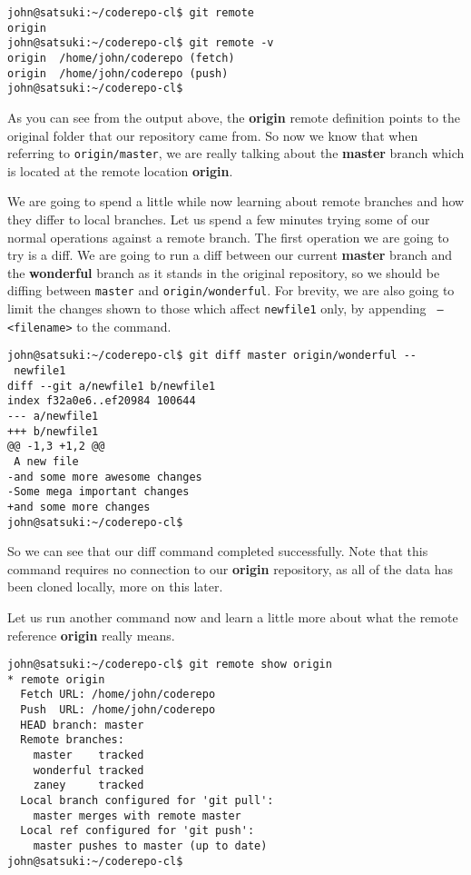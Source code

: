 \begin{Verbatim}
john@satsuki:~/coderepo-cl$ git remote
origin
john@satsuki:~/coderepo-cl$ git remote -v
origin	/home/john/coderepo (fetch)
origin	/home/john/coderepo (push)
john@satsuki:~/coderepo-cl$ 
\end{Verbatim}

As you can see from the output above, the \textbf{origin} remote definition points to the original folder that our repository came from.  So now we know that when referring to \texttt{origin/master}, we are really talking about the \textbf{master} branch which is located at the remote location \textbf{origin}.

We are going to spend a little while now learning about remote branches and how they differ to local branches.  Let us spend a few minutes trying some of our normal operations against a remote branch.  The first operation we are going to try is a diff.  We are going to run a diff between our current \textbf{master} branch and the \textbf{wonderful} branch as it stands in the original repository, so we should be diffing between \texttt{master} and \texttt{origin/wonderful}.  For brevity, we are also going to limit the changes shown to those which affect \texttt{newfile1} only, by appending \texttt{ -- <filename>} to the command.

\begin{Verbatim}
john@satsuki:~/coderepo-cl$ git diff master origin/wonderful -- 
 newfile1
diff --git a/newfile1 b/newfile1
index f32a0e6..ef20984 100644
--- a/newfile1
+++ b/newfile1
@@ -1,3 +1,2 @@
 A new file
-and some more awesome changes
-Some mega important changes
+and some more changes
john@satsuki:~/coderepo-cl$ 
\end{Verbatim}

So we can see that our diff command completed successfully.  Note that this command requires no connection to our \textbf{origin} repository, as all of the data has been cloned locally, more on this later.  

Let us run another command now and learn a little more about what the remote reference \textbf{origin} really means.

\begin{Verbatim}
john@satsuki:~/coderepo-cl$ git remote show origin
* remote origin
  Fetch URL: /home/john/coderepo
  Push  URL: /home/john/coderepo
  HEAD branch: master
  Remote branches:
    master    tracked
    wonderful tracked
    zaney     tracked
  Local branch configured for 'git pull':
    master merges with remote master
  Local ref configured for 'git push':
    master pushes to master (up to date)
john@satsuki:~/coderepo-cl$ 
\end{Verbatim}

